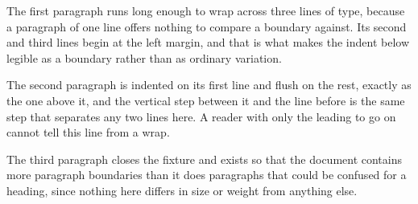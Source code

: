 \documentclass{article}
\begin{document}
The first paragraph runs long enough to wrap across three lines of type, because a
paragraph of one line offers nothing to compare a boundary against. Its second and
third lines begin at the left margin, and that is what makes the indent below
legible as a boundary rather than as ordinary variation.

The second paragraph is indented on its first line and flush on the rest, exactly
as the one above it, and the vertical step between it and the line before is the
same step that separates any two lines here. A reader with only the leading to go
on cannot tell this line from a wrap.

The third paragraph closes the fixture and exists so that the document contains
more paragraph boundaries than it does paragraphs that could be confused for a
heading, since nothing here differs in size or weight from anything else.
\end{document}
